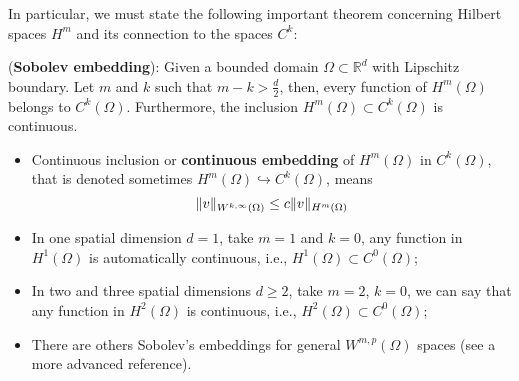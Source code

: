 In particular, we must state the following important theorem
concerning Hilbert spaces $H^m$ and its connection
to the spaces $C^k$:
\begin{theorem}
 (\textbf{Sobolev embedding}):
Given a bounded domain $\Omega \subset \mathbb{R}^d$
with Lipschitz boundary.
Let $m$ and $k$ such that $m - k > \frac{d}{2}$, then, every function of 
$H^m(\Omega)$ belongs to $C^k(\Omega)$. Furthermore, the inclusion
$H^m(\Omega) \subset C^k(\Omega)$ is continuous. 
\end{theorem}


\begin{itemize}
\item Continuous inclusion or \textbf{continuous embedding} of $H^m(\Omega)$
in $C^k(\Omega)$,
that is denoted sometimes $H^m(\Omega) \hookrightarrow C^k(\Omega)$,
means
\begin{equation}
\lVert v \rVert_{W^{k,\infty}(\Omega)} \le c \lVert v \rVert_{H^{m}(\Omega)} \labeq{Wkinftynorm}
\end{equation}

\item In one spatial dimension $d = 1$, take
$m=1$ and $k=0$, any function in $H^1(\Omega)$ is
automatically continuous, i.e., $H^1(\Omega) \subset C^0(\Omega)$;\\

\item In two and three spatial dimensions $d \ge 2$, take $m=2$, $k=0$,
we can say that any function in $H^2(\Omega)$ is continuous, i.e.,
$H^2(\Omega) \subset C^0(\Omega)$;\\

\item There are others Sobolev's embeddings for general $W^{m,p}(\Omega)$
spaces (see a more advanced reference).

\end{itemize}



